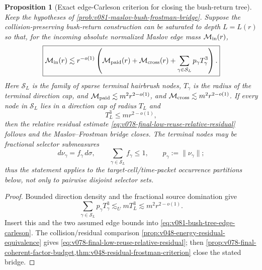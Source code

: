 \documentclass[10pt]{article}
\newtheorem{proposition}[theorem]{Proposition}
\begin{document}
\begin{proposition}[Exact edge-Carleson criterion for closing the bush-return tree]
\label{prop:v081-bush-tree-edge-carleson-criterion}
Keep the hypotheses of
\cref{prob:v081-maslov-bush-frostman-bridge}.  Suppose the collision-preserving bush-return
construction can be saturated to depth \(L=L(r)\) so that, for the incoming absolute normalized
Maslov edge mass \(\mathcal M_{\rm in}(r)\),
\begin{equation}
\label{eq:v081-bush-tree-edge-carleson}
\boxed{
\mathcal M_{\rm in}(r)
\lesssim
r^{-o(1)}
\left(
\mathcal M_{\rm paid}(r)
 +
\mathcal M_{\rm cross}(r)
 +
 \sum_{\gamma\in\mathcal S_L}p_\gamma T_\gamma^3
\right).
}
\end{equation}
Here \(\mathcal S_L\) is the family of sparse terminal hairbrush nodes, \(T_\gamma\) is the
radius of the terminal direction cap, and
\(\mathcal M_{\rm paid}\lesssim m^2r^{2-o(1)}\), and
\(\mathcal M_{\rm cross}\lesssim m^2r^{2-o(1)}\).  If every node in
\(\mathcal S_L\) lies in a direction cap of radius \(T_L\) and
\[
T_L^3\le mr^{2-o(1)},
\]
then the relative residual estimate
\eqref{eq:v078-final-low-reuse-relative-residual} follows and the Maslov--Frostman bridge closes.
The terminal nodes may be fractional selector submeasures
\[
d\nu_\gamma=f_\gamma\,d\sigma,
\qquad
\sum_{\gamma\in\mathcal S_L}f_\gamma\le1,
\qquad
p_\gamma:=\|\nu_\gamma\|;
\]
thus the statement applies to the target-cell/time-packet occurrence partitions below, not only to
pairwise disjoint selector sets.
\end{proposition}

\begin{proof}
Bounded direction density and the fractional source domination give
\[
\sum_{\gamma\in\mathcal S_L}p_\gamma T_\gamma^3
\lesssim_U
mT_L^3
\lesssim
m^2r^{2-o(1)}.
\]
Insert this and the two assumed edge bounds into
\eqref{eq:v081-bush-tree-edge-carleson}.  The collision/residual comparison
\cref{prop:v048-energy-residual-equivalence} gives
\eqref{eq:v078-final-low-reuse-relative-residual}; then
\cref{prop:v078-final-coherent-factor-budget,thm:v048-residual-frostman-criterion} close the stated
bridge.
\end{proof}
\end{document}
